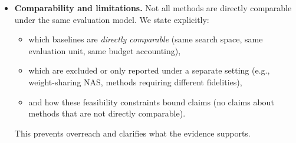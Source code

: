 \begin{itemize}
    \item \textbf{Comparability and limitations.}
    Not all methods are directly comparable under the same evaluation model.
    We state explicitly:
    \begin{itemize}
        \item which baselines are \emph{directly comparable} (same search space, same evaluation unit, same budget accounting),
        \item which are excluded or only reported under a separate setting (e.g., weight-sharing NAS, methods requiring different fidelities),
        \item and how these feasibility constraints bound claims (no claims about methods that are not directly comparable).
    \end{itemize}
    This prevents overreach and clarifies what the evidence supports.
\end{itemize}
